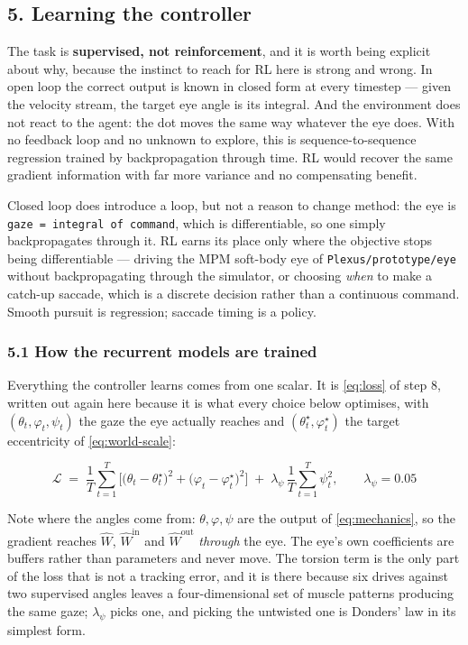 \documentclass[10pt]{article}
\begin{document}
\subsection*{5. Learning the controller}

The task is \textbf{supervised, not reinforcement}, and it is worth being explicit about
why, because the instinct to reach for RL here is strong and wrong. In open loop the correct
output is known in closed form at every timestep --- given the velocity stream, the target
eye angle is its integral. And the environment does not react to the agent: the dot moves
the same way whatever the eye does. With no feedback loop and no unknown to explore, this is
sequence-to-sequence regression trained by backpropagation through time. RL would recover
the same gradient information with far more variance and no compensating benefit.

Closed loop does introduce a loop, but not a reason to change method: the eye is
\texttt{gaze = integral of command}, which is differentiable, so one simply backpropagates
through it. RL earns its place only where the objective stops being differentiable ---
driving the MPM soft-body eye of \texttt{Plexus/prototype/eye} without backpropagating
through the simulator, or choosing \emph{when} to make a catch-up saccade, which is a
discrete decision rather than a continuous command. Smooth pursuit is regression; saccade
timing is a policy.

\subsubsection*{5.1 How the recurrent models are trained}

Everything the controller learns comes from one scalar. It is \eqref{eq:loss} of step 8,
written out again here because it is what every choice below optimises, with
$(\theta_t,\varphi_t,\psi_t)$ the gaze the eye actually reaches and
$(\theta^{\star}_t,\varphi^{\star}_t)$ the target eccentricity of \eqref{eq:world-scale}:

\begin{equation}
\label{eq:loss-again}
\mathcal{L}\;=\;\frac{1}{T}\sum_{t=1}^{T}
\Big[\big(\theta_t-\theta^{\star}_t\big)^{2}
+\big(\varphi_t-\varphi^{\star}_t\big)^{2}\Big]
\;+\;\lambda_\psi\,\frac{1}{T}\sum_{t=1}^{T}\psi_t^{2},
\qquad \lambda_\psi=0.05
\end{equation}

Note where the angles come from: $\theta,\varphi,\psi$ are the output of
\eqref{eq:mechanics}, so the gradient reaches $\hat W$, $\hat W^{\mathrm{in}}$ and $\hat
W^{\mathrm{out}}$ \emph{through} the eye. The eye's own coefficients are buffers rather than
parameters and never move. The torsion term is the only part of the loss that is not a
tracking error, and it is there because six drives against two supervised angles leaves a
four-dimensional set of muscle patterns producing the same gaze; $\lambda_\psi$ picks one,
and picking the untwisted one is Donders' law in its simplest form.
\end{document}
